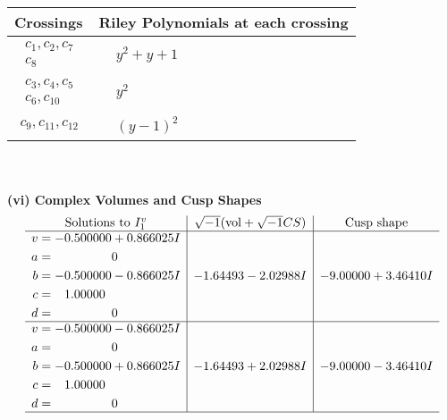 \documentclass[1p]{elsarticle_modified}
\theoremstyle{definition}
\newcommand{\I}{\sqrt{-1}}
\begin{document}
\begin{tabular}{m{50pt}|m{274pt}}
Crossings & \hspace{64pt}Riley Polynomials at each crossing \\
\hline $$\begin{aligned}c_{1},c_{2},c_{7}\\c_{8}\end{aligned}$$&$\begin{aligned}
&y^2+y+1
\end{aligned}$\\
\hline $$\begin{aligned}c_{3},c_{4},c_{5}\\c_{6},c_{10}\end{aligned}$$&$\begin{aligned}
&y^2
\end{aligned}$\\
\hline $$\begin{aligned}c_{9},c_{11},c_{12}\end{aligned}$$&$\begin{aligned}
&(y-1)^2
\end{aligned}$\\
\hline
\end{tabular}\\~\\
\newpage\flushleft \textbf{(vi) Complex Volumes and Cusp Shapes}
$$\begin{array}{c|c|c}  
\text{Solutions to }I^v_{1}& \I (\text{vol} + \sqrt{-1}CS) & \text{Cusp shape}\\
 \hline 
\begin{aligned}
v &= -0.500000 + 0.866025 I \\
a &= \phantom{-0.000000 } 0 \\
b &= -0.500000 - 0.866025 I \\
c &= \phantom{-}1.00000\phantom{ +0.000000I} \\
d &= \phantom{-0.000000 } 0\end{aligned}
 & -1.64493 - 2.02988 I & -9.00000 + 3.46410 I \\ \hline\begin{aligned}
v &= -0.500000 - 0.866025 I \\
a &= \phantom{-0.000000 } 0 \\
b &= -0.500000 + 0.866025 I \\
c &= \phantom{-}1.00000\phantom{ +0.000000I} \\
d &= \phantom{-0.000000 } 0\end{aligned}
 & -1.64493 + 2.02988 I & -9.00000 - 3.46410 I\\
 \hline 
 \end{array}$$\newpage\newpage\renewcommand{\arraystretch}{1}
\end{document}
